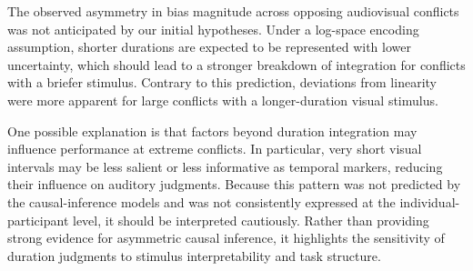 \documentclass[9pt,lineno,doublespacing]{elife}
\begin{document}
The observed asymmetry in bias magnitude across opposing audiovisual conflicts was not anticipated by our initial hypotheses. Under a log-space encoding assumption, shorter durations are expected to be represented with lower uncertainty, which should lead to a stronger breakdown of integration for conflicts with a briefer stimulus. Contrary to this prediction, deviations from linearity were more apparent for large conflicts with a longer-duration visual stimulus.

One possible explanation is that factors beyond duration integration may influence performance at extreme conflicts. In particular, very short visual intervals may be less salient or less informative as temporal markers, reducing their influence on auditory judgments. Because this pattern was not predicted by the causal-inference models and was not consistently expressed at the individual-participant level, it should be interpreted cautiously. Rather than providing strong evidence for asymmetric causal inference, it highlights the sensitivity of duration judgments to stimulus interpretability and task structure.



\end{document}
